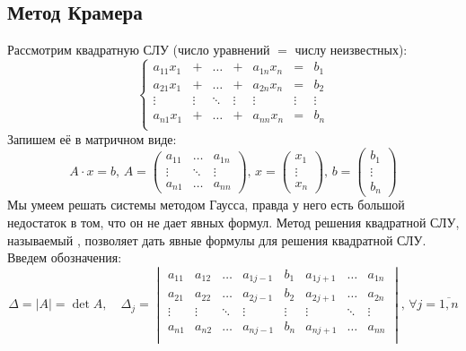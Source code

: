 \documentclass[12pt]{article}
\theoremstyle{definition}
\begin{document}
\subsection*{Метод Крамера}

Рассмотрим квадратную СЛУ (число уравнений $=$ числу неизвестных):
$$
	\left\{
		\begin{matrix}
			a_{11}x_1 & + & \dotsc & + & a_{1n}x_n & = & b_1 \\
			a_{21}x_1 & + & \dotsc & + & a_{2n}x_n & = & b_2 \\
			\vdots & \vdots & \ddots & \vdots & \vdots & \vdots & \vdots \\
			a_{n1}x_1 & + & \dotsc & + & a_{nn}x_n & = & b_n \\
		\end{matrix}
	\right.
$$
Запишем её в матричном виде:
$$
	A{\cdot}x = b, \, A = 
	\begin{pmatrix}
		a_{11} & \dotsc & a_{1n}\\
		\vdots & \ddots & \vdots \\
		a_{n1} & \dotsc & a_{nn}
	\end{pmatrix}, \, x = 
	\begin{pmatrix}
		x_1 \\
		\vdots \\
		x_n
	\end{pmatrix}, \, 
	b = \begin{pmatrix}
		b_1 \\
		\vdots \\
		b_n
	\end{pmatrix}
$$
Мы умеем решать системы методом Гаусса, правда у него есть большой недостаток в том, что он не дает явных формул. Метод решения квадратной СЛУ, называемый , позволяет дать явные формулы для решения квадратной СЛУ. Введем обозначения:
$$
	\Delta = |A| = \det{A}, \quad \Delta_j = 
	\begin{vmatrix}
		a_{11} & a_{12} & \dotsc & a_{1j-1} & b_1 & a_{1 j+ 1} & \dotsc & a_{1n}\\
		a_{21} & a_{22} & \dotsc & a_{2j-1} & b_2 & a_{2 j+ 1} & \dotsc & a_{2n}\\
		\vdots & \vdots & \ddots & \vdots   & \vdots& \vdots   & \ddots & \vdots \\
		a_{n1} & a_{n2} & \dotsc & a_{nj-1} & b_n & a_{n j+ 1} & \dotsc & a_{nn}\\
	\end{vmatrix}, \, \forall j = \overline{1,n}
$$
\end{document}
